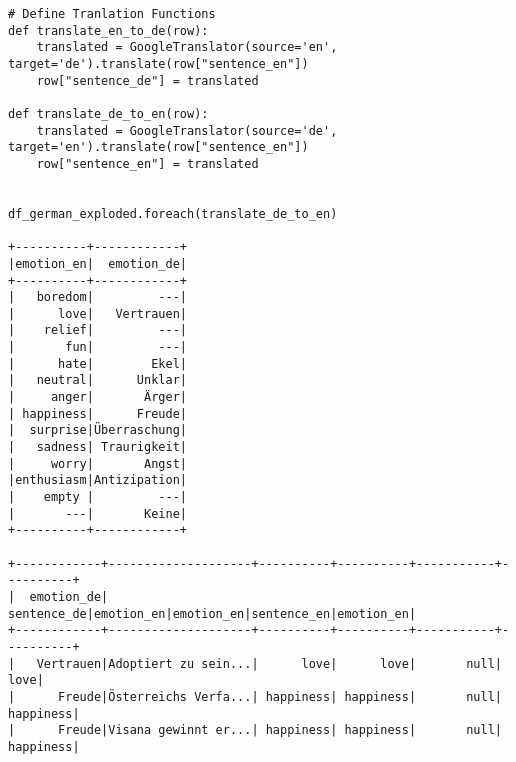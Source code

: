 \begin{verbatim}
# Define Tranlation Functions
def translate_en_to_de(row):
    translated = GoogleTranslator(source='en', target='de').translate(row["sentence_en"])
    row["sentence_de"] = translated

def translate_de_to_en(row):
    translated = GoogleTranslator(source='de', target='en').translate(row["sentence_en"])
    row["sentence_en"] = translated
    

df_german_exploded.foreach(translate_de_to_en)  

+----------+------------+
|emotion_en|  emotion_de|
+----------+------------+
|   boredom|         ---|
|      love|   Vertrauen|
|    relief|         ---|
|       fun|         ---|
|      hate|        Ekel|
|   neutral|      Unklar|
|     anger|       Ärger|
| happiness|      Freude|
|  surprise|Überraschung|
|   sadness| Traurigkeit|
|     worry|       Angst|
|enthusiasm|Antizipation|
|    empty |         ---|
|       ---|       Keine|
+----------+------------+

+------------+--------------------+----------+----------+-----------+----------+
|  emotion_de|         sentence_de|emotion_en|emotion_en|sentence_en|emotion_en|
+------------+--------------------+----------+----------+-----------+----------+
|   Vertrauen|Adoptiert zu sein...|      love|      love|       null|      love|
|      Freude|Österreichs Verfa...| happiness| happiness|       null| happiness|
|      Freude|Visana gewinnt er...| happiness| happiness|       null| happiness|
\end{verbatim}
\clearpage
